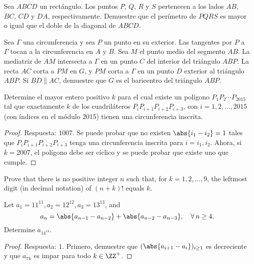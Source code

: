 \begin{probEG}
  Sea $ABCD$ un rectángulo. Los puntos $P$, $Q$, $R$ y $S$ pertenecen a los
  lados $AB$, $BC$, $CD$ y $DA$, respectivamente. Demuestre que el perímetro de
  $PQRS$ es mayor o igual que el doble de la diagonal de $ABCD$.
\end{probEG}

\begin{probEG}
  Sea $\Gamma$ una circunferencia y sea $P$ un punto en su exterior. Las
  tangentes por $P$ a $\Gamma$ tocan a la circunferencia en $A$ y $B$. Sea $M$
  el punto medio del segmento $AB$. La mediatriz de $AM$ intersecta a $\Gamma$
  en un punto $C$ del interior del triángulo $ABP$. La recta $AC$ corta a $PM$
  en $G$, y $PM$ corta a $\Gamma$ en un punto $D$ exterior al triángulo $ABP$.
  Si $BD\parallel AC$, demuestre que $G$ es el baricentro del triángulo $ABP$.
\end{probEG}

\begin{probEG}
  Determine el mayor entero positivo $k$ para el cual existe un polígono
  $P_1P_2\cdots P_{2015}$ tal que exactamente $k$ de los cuadriláteros
  $P_iP_{i+1}P_{i+2}P_{i+3}$, con $i=1,2,\dots,2015$ (con índices en el módulo
  $2015$) tienen una circunferencia inscrita.
\end{probEG}

\begin{proof}
  Respuesta: $1007$. Se puede probar que no existen $\abs{i_1-i_2}=1$ tales que
  $P_iP_{i+1}P_{i+2}P_{i+3}$ tenga una circunferencia inscrita para $i=i_1,i_2$.
  Ahora, si $k=2007$, el polígono debe ser cíclico y se puede probar que existe
  uno que cumple.
\end{proof}


\begin{probEG}[ISL 2001/N1]
  Prove that there is no positive integer $n$ such that, for $k=1,2,\dots,9$,
  the leftmost digit (in decimal notation) of $(n+k)!$ equals $k$.
\end{probEG}

\begin{probMR}[ISL 2001/N3]
  Let $a_1=11^{11},a_2=12^{12},a_3=13^{13}$, and
  \[a_n=\abs{a_{n-1}-a_{n-2}}+\abs{a_{n-2}-a_{n-3}},\quad\forall\,n\ge 4.\]
  Determine $a_{14^{14}}$.
\end{probMR}

\begin{proof}
  Respuesta: $1$. Primero, demuestre que $(\abs{a_{i+1}-a_i})_{i\ge 1}$ es
  decreciente y que $a_{7k}$ es impar para todo $k\in\ZZ^+$.
\end{proof}

